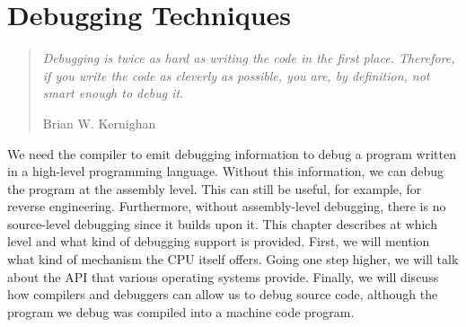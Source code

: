 \chapter{Debugging Techniques}

\begin{quote}
  \textit{Debugging is twice as hard as writing the code in the first place.
    Therefore, if you write the code as cleverly as possible, you are, by
    definition, not smart enough to debug it.}\begin{flushright}
    \scriptsize{Brian W. Kernighan}
  \end{flushright}
\end{quote}

We need the compiler to emit debugging information to debug a program written
in a high-level programming language. Without this information, we can debug
the program at the assembly level. This can still be useful, for example, for
reverse engineering. Furthermore, without assembly-level debugging, there is no
source-level debugging since it builds upon it. This chapter describes at which
level and what kind of debugging support is provided. First, we will mention
what kind of mechanism the CPU itself offers. Going one step higher, we will
talk about the API that various operating systems provide. Finally, we will
discuss how compilers and debuggers can allow us to debug source code, although
the program we debug was compiled into a machine code program.

